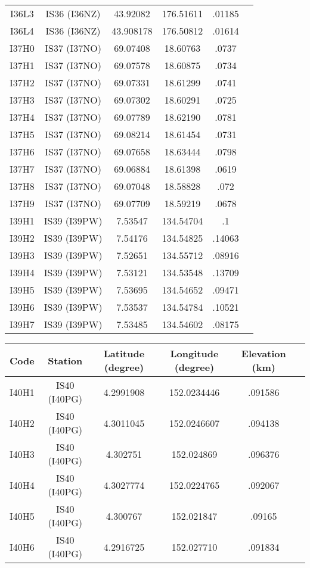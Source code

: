 \documentclass[a4paper, 10pt]{report}
\begin{document}
{\begin{center}
\begin{tabular}{|c|c|c|c|c|c|}
I36L3&	IS36 (I36NZ)&	 	43.92082&	176.51611&	.01185\\
I36L4&	IS36 (I36NZ)&	 	43.908178&	176.50812&	.01614\\
I37H0&	IS37 (I37NO)&	 	69.07408&	18.60763&	.0737\\
I37H1&	IS37 (I37NO)&	 	69.07578&	18.60875&	.0734\\
I37H2&	IS37 (I37NO)&	 	69.07331&	18.61299&	.0741\\
I37H3&	IS37 (I37NO)&	 	69.07302&	18.60291&	.0725\\
I37H4&	IS37 (I37NO)&	 	69.07789&	18.62190&	.0781\\
I37H5&	IS37 (I37NO)&	 	69.08214&	18.61454&	.0731\\
I37H6&	IS37 (I37NO)&	 	69.07658&	18.63444&	.0798\\
I37H7&	IS37 (I37NO)&	 	69.06884&	18.61398&	.0619\\
I37H8&	IS37 (I37NO)&	 	69.07048&	18.58828&	.072\\
I37H9&	IS37 (I37NO)&	 	69.07709&	18.59219&	.0678\\
I39H1&	IS39 (I39PW)&	 	7.53547&	134.54704&	.1\\
I39H2&	IS39 (I39PW)&	 	7.54176&	134.54825&	.14063\\
I39H3&	IS39 (I39PW)&	 	7.52651&	134.55712&	.08916\\
I39H4&	IS39 (I39PW)&	 	7.53121&	134.53548&	.13709\\
I39H5&	IS39 (I39PW)&	 	7.53695&	134.54652&	.09471\\
I39H6&	IS39 (I39PW)&	 	7.53537&	134.54784&	.10521\\
I39H7&	IS39 (I39PW)&	 	7.53485&	134.54602&	.08175\\
\hline
\end{tabular}
\end{center}
\begin{center}
\begin{tabular}{|c|c|c|c|c|c|}
\hline
Code&	Station&	Latitude (degree)&	Longitude (degree)&	Elevation (km)\\
\hline
I40H1&	IS40 (I40PG)&	 	4.2991908&	152.0234446&	.091586\\
I40H2&	IS40 (I40PG)&	 	4.3011045&	152.0246607&	.094138\\
I40H3&	IS40 (I40PG)&	 	4.302751&	152.024869&	.096376\\
I40H4&	IS40 (I40PG)&	 	4.3027774&	152.0224765&	.092067\\
I40H5&	IS40 (I40PG)&	 	4.300767&	152.021847&	.09165\\
I40H6&	IS40 (I40PG)&	 	4.2916725&	152.027710&	.091834\\

\end{tabular}
\end{center}}
\end{document}
